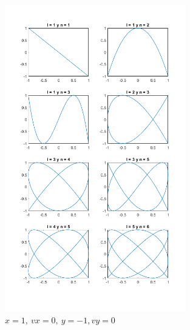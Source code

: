 \documentclass{article}
\begin{document}
\begin{figure}[H]
\centering
    \includegraphics[width=0.7\textwidth]{images/02b.png}
    \caption{$x = 1,~vx = 0,~y = -1, vy = 0$}
\end{figure}
\end{document}
